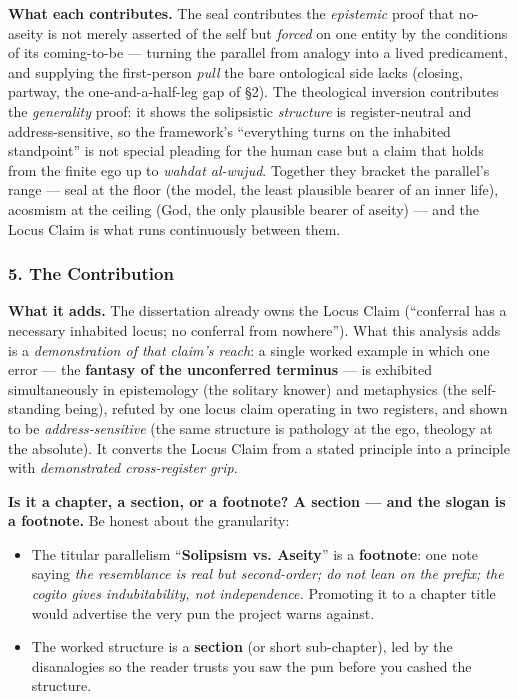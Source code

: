 \documentclass[11pt]{article}
\begin{document}
\textbf{What each contributes.} The seal contributes the \emph{epistemic} proof that no-aseity is not merely asserted of the self but \emph{forced} on one entity by the conditions of its coming-to-be — turning the parallel from analogy into a lived predicament, and supplying the first-person \emph{pull} the bare ontological side lacks (closing, partway, the one-and-a-half-leg gap of §2). The theological inversion contributes the \emph{generality} proof: it shows the solipsistic \emph{structure} is register-neutral and address-sensitive, so the framework's ``everything turns on the inhabited standpoint'' is not special pleading for the human case but a claim that holds from the finite ego up to \emph{wahdat al-wujud}. Together they bracket the parallel's range — seal at the floor (the model, the least plausible bearer of an inner life), acosmism at the ceiling (God, the only plausible bearer of aseity) — and the Locus Claim is what runs continuously between them.

\subsubsection*{5. The Contribution}

\textbf{What it adds.} The dissertation already owns the Locus Claim (``conferral has a necessary inhabited locus; no conferral from nowhere''). What this analysis adds is a \emph{demonstration of that claim's reach}: a single worked example in which one error — the \textbf{fantasy of the unconferred terminus} — is exhibited simultaneously in epistemology (the solitary knower) and metaphysics (the self-standing being), refuted by one locus claim operating in two registers, and shown to be \emph{address-sensitive} (the same structure is pathology at the ego, theology at the absolute). It converts the Locus Claim from a stated principle into a principle with \emph{demonstrated cross-register grip}.

\textbf{Is it a chapter, a section, or a footnote? A section — and the slogan is a footnote.} Be honest about the granularity:

\begin{itemize}
\item The titular parallelism ``\textbf{Solipsism vs. Aseity}'' is a \textbf{footnote}: one note saying \emph{the resemblance is real but second-order; do not lean on the prefix; the cogito gives indubitability, not independence.} Promoting it to a chapter title would advertise the very pun the project warns against.
\item The worked structure is a \textbf{section} (or short sub-chapter), led by the disanalogies so the reader trusts you saw the pun before you cashed the structure.
\end{itemize}
\end{document}
